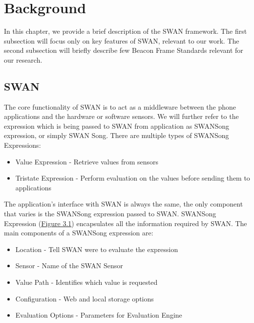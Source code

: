 
\chapter{Background} %

\label{Chapter3} %


In this chapter, we provide a brief description of the SWAN framework.
The first subsection will focus only on key features of SWAN, relevant to our work.
The second subsection will briefly describe few Beacon Frame Standards relevant for our research.

\section{SWAN}
The core functionality of SWAN is to act as a middleware between the phone applications and the hardware or software sensors.
We will further refer to the expression which is being passed to SWAN from application as SWANSong expression, or simply SWAN Song.
There are multiple types of SWANSong Expressions: \label{swan_song_expressions}
\begin{itemize}
 \item Value Expression - Retrieve values from sensors
 \item Tristate Expression - Perform evaluation on the values before sending them to applications
\end{itemize}

The application's interface with SWAN is always the same, the only component that varies is the SWANSong expression passed to SWAN.
SWANSong Expression (\hyperref[fig:SwanExpression]{Figure 3.1}) encapsulates all the information required by SWAN.
The main components of a SWANSong expression are:
\begin{itemize}
 \item Location - Tell SWAN were to evaluate the expression
 \item Sensor - Name of the SWAN Sensor
 \item Value Path - Identifies which value is requested
 \item Configuration - Web and local storage options
 \item Evaluation Options - Parameters for Evaluation Engine
\end{itemize}

